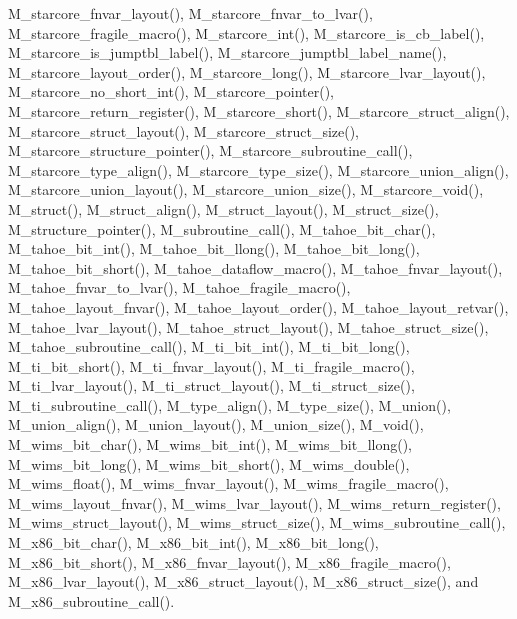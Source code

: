 M\_\-starcore\_\-fnvar\_\-layout(), M\_\-starcore\_\-fnvar\_\-to\_\-lvar(), M\_\-starcore\_\-fragile\_\-macro(), M\_\-starcore\_\-int(), M\_\-starcore\_\-is\_\-cb\_\-label(), M\_\-starcore\_\-is\_\-jumptbl\_\-label(), M\_\-starcore\_\-jumptbl\_\-label\_\-name(), M\_\-starcore\_\-layout\_\-order(), M\_\-starcore\_\-long(), M\_\-starcore\_\-lvar\_\-layout(), M\_\-starcore\_\-no\_\-short\_\-int(), M\_\-starcore\_\-pointer(), M\_\-starcore\_\-return\_\-register(), M\_\-starcore\_\-short(), M\_\-starcore\_\-struct\_\-align(), M\_\-starcore\_\-struct\_\-layout(), M\_\-starcore\_\-struct\_\-size(), M\_\-starcore\_\-structure\_\-pointer(), M\_\-starcore\_\-subroutine\_\-call(), M\_\-starcore\_\-type\_\-align(), M\_\-starcore\_\-type\_\-size(), M\_\-starcore\_\-union\_\-align(), M\_\-starcore\_\-union\_\-layout(), M\_\-starcore\_\-union\_\-size(), M\_\-starcore\_\-void(), M\_\-struct(), M\_\-struct\_\-align(), M\_\-struct\_\-layout(), M\_\-struct\_\-size(), M\_\-structure\_\-pointer(), M\_\-subroutine\_\-call(), M\_\-tahoe\_\-bit\_\-char(), M\_\-tahoe\_\-bit\_\-int(), M\_\-tahoe\_\-bit\_\-llong(), M\_\-tahoe\_\-bit\_\-long(), M\_\-tahoe\_\-bit\_\-short(), M\_\-tahoe\_\-dataflow\_\-macro(), M\_\-tahoe\_\-fnvar\_\-layout(), M\_\-tahoe\_\-fnvar\_\-to\_\-lvar(), M\_\-tahoe\_\-fragile\_\-macro(), M\_\-tahoe\_\-layout\_\-fnvar(), M\_\-tahoe\_\-layout\_\-order(), M\_\-tahoe\_\-layout\_\-retvar(), M\_\-tahoe\_\-lvar\_\-layout(), M\_\-tahoe\_\-struct\_\-layout(), M\_\-tahoe\_\-struct\_\-size(), M\_\-tahoe\_\-subroutine\_\-call(), M\_\-ti\_\-bit\_\-int(), M\_\-ti\_\-bit\_\-long(), M\_\-ti\_\-bit\_\-short(), M\_\-ti\_\-fnvar\_\-layout(), M\_\-ti\_\-fragile\_\-macro(), M\_\-ti\_\-lvar\_\-layout(), M\_\-ti\_\-struct\_\-layout(), M\_\-ti\_\-struct\_\-size(), M\_\-ti\_\-subroutine\_\-call(), M\_\-type\_\-align(), M\_\-type\_\-size(), M\_\-union(), M\_\-union\_\-align(), M\_\-union\_\-layout(), M\_\-union\_\-size(), M\_\-void(), M\_\-wims\_\-bit\_\-char(), M\_\-wims\_\-bit\_\-int(), M\_\-wims\_\-bit\_\-llong(), M\_\-wims\_\-bit\_\-long(), M\_\-wims\_\-bit\_\-short(), M\_\-wims\_\-double(), M\_\-wims\_\-float(), M\_\-wims\_\-fnvar\_\-layout(), M\_\-wims\_\-fragile\_\-macro(), M\_\-wims\_\-layout\_\-fnvar(), M\_\-wims\_\-lvar\_\-layout(), M\_\-wims\_\-return\_\-register(), M\_\-wims\_\-struct\_\-layout(), M\_\-wims\_\-struct\_\-size(), M\_\-wims\_\-subroutine\_\-call(), M\_\-x86\_\-bit\_\-char(), M\_\-x86\_\-bit\_\-int(), M\_\-x86\_\-bit\_\-long(), M\_\-x86\_\-bit\_\-short(), M\_\-x86\_\-fnvar\_\-layout(), M\_\-x86\_\-fragile\_\-macro(), M\_\-x86\_\-lvar\_\-layout(), M\_\-x86\_\-struct\_\-layout(), M\_\-x86\_\-struct\_\-size(), and M\_\-x86\_\-subroutine\_\-call().
